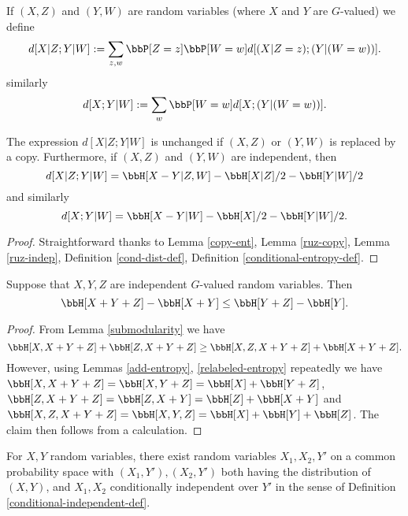 \begin{definition}\label{cond-dist-def}
  \leanok
If $(X, Z)$ and $(Y, W)$ are random variables (where $X$ and $Y$ are $G$-valued) we define
$$ d[X  | Z; Y | W] := \sum_{z,w}  \bbP[Z=z]  \bbP[W=w] d[(X|Z=z); (Y|(W=w))].$$
similarly
$$ d[X; Y | W] := \sum_{w}  \bbP[W=w] d[X; (Y|(W=w))].$$
\end{definition}

\begin{lemma}\label{cond-dist-alt}
\leanok
  The expression $d[X  | Z;Y | W]$ is unchanged if $(X,Z)$ or $(Y,W)$ is replaced by a copy.  Furthermore, if $(X,Z)$ and $(Y,W)$ are independent, then
$$  d[X  | Z;Y | W] = \bbH[X-Y|Z,W] - \bbH[X|Z]/2 - \bbH[Y|W]/2$$
and similarly
$$  d[X;Y | W] = \bbH[X-Y|W] - \bbH[X]/2 - \bbH[Y|W]/2.$$
\end{lemma}

\begin{proof}\leanok Straightforward thanks to Lemma \ref{copy-ent}, Lemma \ref{ruz-copy}, Lemma \ref{ruz-indep}, Definition \ref{cond-dist-def}, Definition \ref{conditional-entropy-def}.
\end{proof}

\begin{lemma}\label{kv}
  \leanok
Suppose that $X, Y, Z$ are independent $G$-valued random variables. Then
\[
  \bbH[X + Y + Z] - \bbH[X + Y] \leq \bbH[Y+Z] - \bbH[Y].
\]
\end{lemma}

\begin{proof}\leanok
From Lemma \ref{submodularity} we have
$$ \bbH[X, X+Y+Z] + \bbH[Z, X+Y+Z] \geq \bbH[X, Z, X+Y+Z] + \bbH[X+Y+Z].$$
However, using Lemmas \ref{add-entropy}, \ref{relabeled-entropy} repeatedly we have $\bbH[X, X+Y+Z] = \bbH[X, Y+Z] = \bbH[X] + \bbH[Y+Z]$, $\bbH[Z, X+Y + Z] = \bbH[Z, X+Y] = \bbH[Z] + \bbH[X+Y]$ and $\bbH[X, Z, X+Y+Z] = \bbH[X, Y, Z] = \bbH[X] + \bbH[Y] + \bbH[Z]$.  The claim then follows from a calculation.
\end{proof}

\begin{lemma}\label{cond-indep-exist}
  \leanok
  For $X,Y$ random variables, there exist random variables $X_1,X_2,Y'$ on a common probability space with $(X_1, Y'), (X_2, Y')$ both having the distribution of $(X,Y)$, and $X_1, X_2$ conditionally independent over $Y'$ in the sense of Definition \ref{conditional-independent-def}.
\end{lemma}

